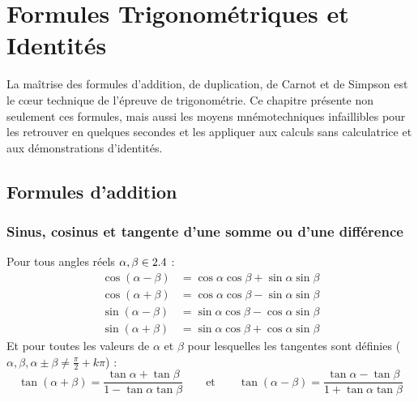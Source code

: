 \chapter{Formules Trigonométriques et Identités}

La maîtrise des formules d'addition, de duplication, de Carnot et de Simpson est le cœur technique de l'épreuve de trigonométrie. Ce chapitre présente non seulement ces formules, mais aussi les moyens mnémotechniques infaillibles pour les retrouver en quelques secondes et les appliquer aux calculs sans calculatrice et aux démonstrations d'identités.

\section{Formules d'addition}

\subsection{Sinus, cosinus et tangente d'une somme ou d'une différence}

\begin{theoreme}
Pour tous angles réels $\alpha, \beta \in 2.4$ :
\begin{align}
    \cos(\alpha - \beta) &= \cos\alpha\cos\beta + \sin\alpha\sin\beta \\
    \cos(\alpha + \beta) &= \cos\alpha\cos\beta - \sin\alpha\sin\beta \\
    \sin(\alpha - \beta) &= \sin\alpha\cos\beta - \cos\alpha\sin\beta \\
    \sin(\alpha + \beta) &= \sin\alpha\cos\beta + \cos\alpha\sin\beta
\end{align}
Et pour toutes les valeurs de $\alpha$ et $\beta$ pour lesquelles les tangentes sont définies ($\alpha, \beta, \alpha\pm\beta \neq \frac{\pi}{2} + k\pi$) :
\begin{equation}
    \boxed{\tan(\alpha + \beta) = \frac{\tan\alpha + \tan\beta}{1 - \tan\alpha\tan\beta} \qquad \text{et} \qquad \tan(\alpha - \beta) = \frac{\tan\alpha - \tan\beta}{1 + \tan\alpha\tan\beta}}
\end{equation}
\end{theoreme}

